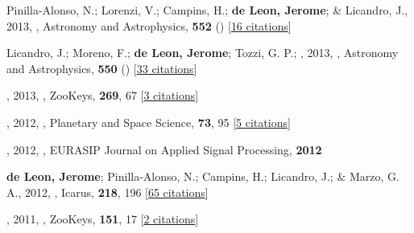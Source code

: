 \item[{\color{numcolor}\scriptsize52}] Pinilla-Alonso, N.; Lorenzi, V.; Campins, H.; \textbf{de Leon, Jerome}; \& Licandro, J., 2013, , Astronomy and Astrophysics, \textbf{552} () [\href{https://ui.adsabs.harvard.edu/abs/2013A&A...552A..79P}{16 citations}]

\item[{\color{numcolor}\scriptsize51}] Licandro, J.; Moreno, F.; \textbf{de Leon, Jerome}; Tozzi, G. P.; \etal, 2013, , Astronomy and Astrophysics, \textbf{550} () [\href{https://ui.adsabs.harvard.edu/abs/2013A&A...550A..17L}{33 citations}]

\item[{\color{numcolor}\scriptsize50}] , 2013, , ZooKeys, \textbf{269}, 67 [\href{https://ui.adsabs.harvard.edu/abs/2013ZooK..269...67D}{3 citations}]

\item[{\color{numcolor}\scriptsize49}] , 2012, , Planetary and Space Science, \textbf{73}, 95 [\href{https://ui.adsabs.harvard.edu/abs/2012P&SS...73...95C}{5 citations}]

\item[{\color{numcolor}\scriptsize48}] , 2012, , EURASIP Journal on Applied Signal Processing, \textbf{2012}

\item[{\color{numcolor}\scriptsize47}] \textbf{de Leon, Jerome}; Pinilla-Alonso, N.; Campins, H.; Licandro, J.; \& Marzo, G. A., 2012, , Icarus, \textbf{218}, 196 [\href{https://ui.adsabs.harvard.edu/abs/2012Icar..218..196D}{65 citations}]

\item[{\color{numcolor}\scriptsize46}] , 2011, , ZooKeys, \textbf{151}, 17 [\href{https://ui.adsabs.harvard.edu/abs/2011ZooK..151...17G}{2 citations}]


